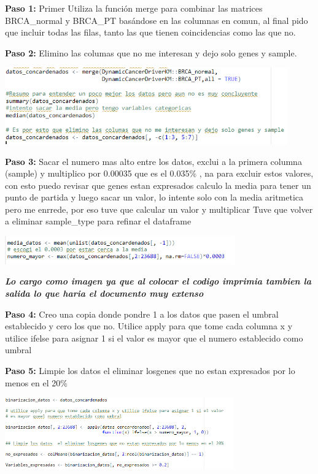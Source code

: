\documentclass[
]{article}
\begin{document}
\textbf{Paso 1:} Primer Utiliza la función merge para combinar las
matrices BRCA\_normal y BRCA\_PT basándose en las columnas en comun, al
final pido que incluir todas las filas, tanto las que tienen
coincidencias como las que no.

\textbf{Paso 2:} Elimino las columas que no me interesan y dejo solo
genes y sample.

\includegraphics[width=4.79167in,height=\textheight]{images/PASO 1 Y 2.png}

\textbf{Paso 3:} Sacar el numero mas alto entre los datos, exclui a la
primera columna (sample) y multiplico por 0.00035 que es el 0.035\% , na
para excluir estos valores, con esto puedo revisar que genes estan
expresados calculo la media para tener un punto de partida y luego sacar
un valor, lo intente solo con la media aritmetica pero me enrrede, por
eso tuve que calcular un valor y multiplicar Tuve que volver a eliminar
sample\_type para refinar el dataframe

\includegraphics[width=3.90625in,height=\textheight]{images/3.png}

\textbf{\emph{Lo cargo como imagen ya que al colocar el codigo imprimia
tambien la salida lo que haria el documento muy extenso}}

\textbf{Paso 4:} Creo una copia donde pondre 1 a los datos que pasen el
umbral establecido y cero los que no. Utilice apply para que tome cada
columna x y utilice ifelse para asignar 1 si el valor es mayor que el
numero establecido como umbral

\textbf{Paso 5:} Limpie los datos el eliminar losgenes que no estan
expresados por lo menos en el 20\%

\includegraphics[width=3.875in,height=\textheight]{images/binarizacion.png}
\end{document}
